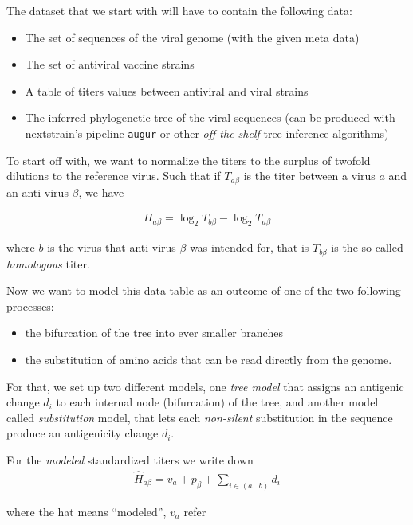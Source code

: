 \documentclass[12pt]{scrartcl}
\begin{document}
    The dataset that we start with will have to contain the following data:
    \begin{itemize}
      \item The set of sequences of the viral genome (with the given meta data)
      \item The set of antiviral vaccine strains
      \item A table of \glspl{titer} values between antiviral and viral strains
      \item The inferred phylogenetic tree of the viral sequences (can be produced with nextstrain's pipeline \verb|augur| or other \textit{off the shelf} tree inference algorithms)
    \end{itemize}

    To start off with, we want to normalize the \glspl{titer} to the surplus of twofold dilutions to the reference virus. Such that if $T_{a\beta}$ is the titer between a virus $a$ and an anti virus $\beta$, we have

    \begin{align}
      H_{a\beta} = \log_2T_{b\beta} - \log_2T_{a\beta}
    \end{align}

    where $b$ is the virus that anti virus $\beta$ was intended for, that is $T_{b\beta}$ is the so called \textit{homologous} titer.

    Now we want to model this data table as an outcome of one of the two following processes:
    \begin{itemize}
      \item the bifurcation of the tree into ever smaller branches
      \item the substitution of amino acids that can be read directly from the genome.
    \end{itemize}

    For that, we set up two different models, one \textit{tree model} that assigns an antigenic change $d_i$ to each internal node (bifurcation) of the tree, and another model called \textit{substitution} model, that lets each \textit{non-silent} substitution in the sequence produce an antigenicity change $d_i$.

    For the \textit{modeled} standardized titers we write down
    \begin{align}
      \hat{H}_{a\beta} = v_a + p_\beta + \sum_{i\in(a...b)}d_i
    \end{align}

    where the hat means ``modeled'', $v_a$ refer
\end{document}
